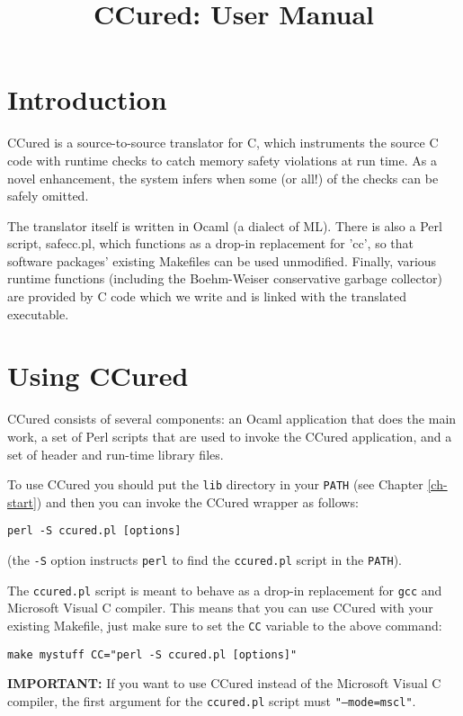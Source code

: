 \documentclass{book}
\title{CCured: User Manual}
\def\t#1{{\tt #1}}
\begin{document}
\maketitle
\chapter{Introduction}

CCured is a source-to-source translator for C, which instruments the source C
code with runtime checks to catch memory safety violations at run time. As a
novel enhancement, the system infers when some (or all!) of the checks can be
safely omitted.

The translator itself is written in Ocaml (a dialect of ML).  There is
also a Perl script, safecc.pl, which functions as a drop-in
replacement for 'cc', so that software packages' existing Makefiles
can be used unmodified.  Finally, various runtime functions (including
the Boehm-Weiser conservative garbage collector) are provided by C
code which we write and is linked with the translated executable.

\chapter{Using CCured}

 CCured consists of several components: an Ocaml application that does the
main work, a set of Perl scripts that are used to invoke the CCured
application, and a set of header and run-time library files. 

 To use CCured you should put the \t{lib} directory in your \t{PATH} (see
Chapter \ref{ch-start}) and then you can invoke the CCured wrapper as follows:
\begin{verbatim}
perl -S ccured.pl [options]
\end{verbatim}

 (the \t{-S} option instructs \t{perl} to find the \t{ccured.pl} script in the
 \t{PATH}). 

 The \t{ccured.pl} script is meant to behave as a drop-in replacement for
\t{gcc} and Microsoft Visual C compiler. This means that you can use CCured
with your existing Makefile, just make sure to set the \t{CC} variable to the
above command:
\begin{verbatim}
make mystuff CC="perl -S ccured.pl [options]"
\end{verbatim}

 {\bf IMPORTANT:} If you want to use CCured instead of the Microsoft Visual C
compiler, the first argument for the \t{ccured.pl} script must
\t{"--mode=mscl"}. 
\end{document}
